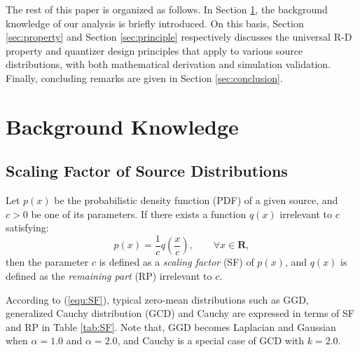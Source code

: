 \documentclass[smallabstract,smallcaptions]{dccpaper}
\begin{document}
The rest of this paper is organized as follows. In Section \ref{sec:background}, the background knowledge of our analysis is briefly introduced. On this basis, Section \ref{sec:property} and Section \ref{sec:principle} respectively discusses the universal R-D property and quantizer design principles that apply to various source distributions, with both mathematical derivation and simulation validation. Finally, concluding remarks are given in Section \ref{sec:conclusion}.

\section{Background Knowledge}
\label{sec:background}

\subsection{Scaling Factor of Source Distributions}

Let $p(x)$ be the probabilistic density function (PDF) of a given source, and $c>0$ be one of its parameters. If there exists a function $q(x)$ irrelevant to $c$ satisfying:
\begin{equation}
\label{equ:SF}
p(x)=\frac{1}{c} q(\frac{x}{c}),\qquad \forall x \in \mathbf{R},
\end{equation}
then the parameter $c$ is defined as a \emph{scaling factor} (SF) of $p(x)$, and $q(x)$ is defined as the \emph{remaining part} (RP) irrelevant to $c$.

According to (\ref{equ:SF}), typical zero-mean distributions such as GGD, generalized Cauchy distribution (GCD) and Cauchy are expressed in terms of SF and RP in Table \ref{tab:SF}. Note that, GGD becomes Laplacian and Gaussian when $\alpha=1.0$ and $\alpha=2.0$, and Cauchy is a special case of GCD with $k=2.0$.
\end{document}

